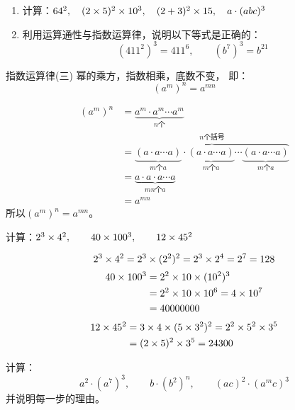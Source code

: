 \begin{ex}
	\begin{enumerate}
		\item 计算：$64^2,\quad (2\times5)^2\times10^3,\quad (2+3)^2\times15,\quad  a\cdot (abc)^3$
		\item 利用运算通性与指数运算律，说明以下等式是正确的：
		\[ (411^2)^3  = 411^6,\qquad (b^7)^3=b^{21} \]
	\end{enumerate}   
\end{ex}

\begin{blk}{指数运算律(三)}
	幂的乘方，指数相乘，底数不变，
	即：
	\[(a^m)^n=a^{mn}\]
\end{blk}

\begin{note}
	\begin{align*}
	(a^m)^n&= \underbrace{a^m\cdot a^m\cdots a^m}_{\text{$n$个}}     \tag{乘方的意义}\\  
	&=\overbrace{\underbrace{(a\cdot a\cdots a)}_{\text{$m$个$a$}}\cdot \underbrace{(a\cdot a\cdots a)}_{\text{$m$个$a$}}\cdots \underbrace{(a\cdot a\cdots a)}_{\text{$m$个$a$}}}^{\text{$n$个括号}}\\
	&=\underbrace{a\cdot a\cdot a\cdots a}_{\text{$mn$个$a$}}\tag{乘法结合律}\\
	&=a^{mn}\tag{乘方的意义}
	\end{align*}
	所以$(a^m)^n=a^{mn}$。
\end{note}

\begin{example}
	计算：$2^3\times 4^2,\qquad 40\times 100^3,\qquad 12\times 45^2$
\end{example}

\begin{solution}
	$$2^3\times 4^2=2^3\times (2^2)^2=2^3\times 2^4=2^7=128$$
	\[\begin{split}
	40\times 100^3&=2^2\times 10\times(10^2)^3\\
	&=2^2\times 10\times 10^6=4\times 10^7\\
	&=40000000
	\end{split}\]
	\[\begin{split}
	12\times 45^2&=3\times 4\times (5\times 3^2)^2=2^2\times 5^2\times 3^5\\
	&=(2\times 5)^2 \times 3^5=24300
	\end{split}\]
\end{solution}

\begin{example}
	计算：
	$$a^2\cdot (a^7)^3,\qquad b\cdot (b^2)^n,\qquad (ac)^2\cdot (a^m c)^3$$
	并说明每一步的理由。
\end{example}

